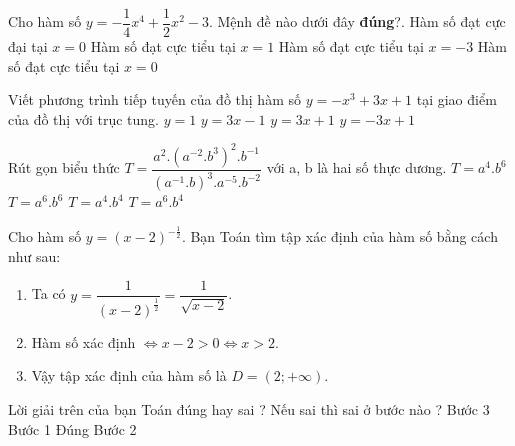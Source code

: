\begin{ex}%
	Cho hàm số $y=-\dfrac{1}{4}x^4+\dfrac{1}{2}x^2-3$. Mệnh đề nào dưới đây {\bf đúng}?.
	\choice
	{Hàm số đạt cực đại tại $x=0$}
	{Hàm số đạt cực tiểu tại $x=1$}
	{Hàm số đạt cực tiểu tại $x=-3$}
	{\True Hàm số đạt cực tiểu tại $x=0$}
\end{ex}
\begin{ex}%
	Viết phương trình tiếp tuyến của đồ thị hàm số $y=-x^3+3x+1$ tại giao điểm của đồ thị với trục tung.
	\choice
	{$y=1$}
	{$y=3x-1$}
	{\True $y=3x+1$}
	{$y=-3x+1$}
\end{ex}
\begin{ex}%
	Rút gọn biểu thức $T= \dfrac{a^2.\left(a^{-2}.b^3\right)^2.b^{-1}}{\left(a^{-1}.b\right)^3.a^{-5}.b^{-2}}$ với a, b là hai số thực dương.
	\choice
	{$T=a^4.b^6$}
	{$T=a^6.b^6$}
	{$T=a^4.b^4$}
	{\True $T=a^6.b^4$}
\end{ex}
\begin{ex}%
	Cho hàm số $y=\left(x-2\right)^{-\frac{1}{2}}$. Bạn Toán tìm tập xác định của hàm số bằng cách như sau:
	\begin{enumerate}
		\item Ta có $y=\dfrac{1}{\left(x-2\right)^{\frac{1}{2}}}=\dfrac{1}{\sqrt{x-2}}$.
		\item  Hàm số xác định $\Leftrightarrow x-2>0\Leftrightarrow x>2$.
		\item Vậy tập xác định của hàm số là $D=\left(2;+\infty\right)$.
	\end{enumerate}
	Lời giải trên của bạn Toán đúng hay sai ? Nếu sai thì sai ở bước nào ?
	\choice
	{Bước 3}
	{Bước 1}
	{\True  Đúng}
	{Bước 2}
	\loigiai{
		
	}
\end{ex}
